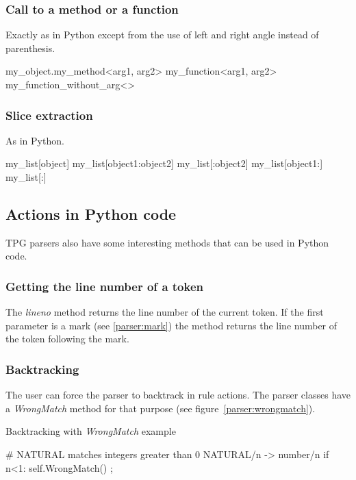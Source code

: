 \subsubsection{Call to a method or a function}

Exactly as in Python except from the use of left and right angle instead of parenthesis.

\begin{verbatimtab}[4]
	my_object.my_method<arg1, arg2>
	my_function<arg1, arg2>
	my_function_without_arg<>
\end{verbatimtab}

\subsubsection{Slice extraction}

As in Python.

\begin{verbatimtab}[4]
	my_list[object]
	my_list[object1:object2]
	my_list[:object2]
	my_list[object1:]
	my_list[:]
\end{verbatimtab}

\subsection{Actions in Python code}

TPG parsers also have some interesting methods that can be used in Python code.

\subsubsection{Getting the line number of a token}

The \emph{lineno} method returns the line number of the current token.
If the first parameter is a mark (see \ref{parser:mark}) the method returns the line number of the token following the mark.

\subsubsection{Backtracking}

The user can force the parser to backtrack in rule actions.
The parser classes have a \emph{WrongMatch} method for that purpose (see figure~\ref{parser:wrongmatch}).

\begin{code}
\caption{Backtracking with \emph{WrongMatch} example} \label{parser:wrongmatch}
\begin{verbatimtab}[4]
	# NATURAL matches integers greater than 0
	NATURAL/n ->
		number/n
		{{ if n<1: self.WrongMatch() }}
		;
\end{verbatimtab}
\end{code}

